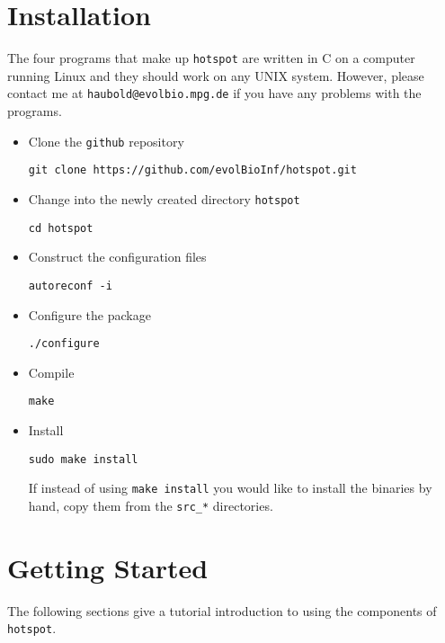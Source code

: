 \documentclass{article}
\newcommand{\bi}{\begin{itemize}}
\newcommand{\ei}{\end{itemize}}
\newcommand{\ty}{\texttt}
\begin{document}
\section{Installation}
The four programs that make up \ty{hotspot} are written in C on a computer running Linux and
they should
work on any UNIX system. However, please contact me at
\ty{haubold@evolbio.mpg.de} if you have any problems with the
programs. 
\bi
\item Clone the \texttt{github} repository
\lstset{language=bash}
\begin{lstlisting}
git clone https://github.com/evolBioInf/hotspot.git
\end{lstlisting}
\item Change into the newly created directory \ty{hotspot}
\begin{lstlisting}
cd hotspot
\end{lstlisting}
\item Construct the configuration files
\begin{lstlisting}
autoreconf -i
\end{lstlisting}
\item Configure the package
\begin{lstlisting}
./configure
\end{lstlisting}
\item Compile
\begin{lstlisting}
make
\end{lstlisting}
\item Install
\begin{lstlisting}
sudo make install
\end{lstlisting}
If instead of using \texttt{make install} you would like to install the binaries by hand, copy them
from the \ty{src\_*} directories.
\ei

\section{Getting Started}
The following sections give a tutorial introduction to using
the components of \ty{hotspot}.
\end{document}
